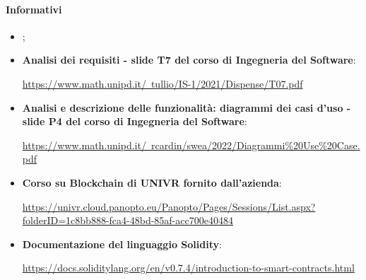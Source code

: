 \paragraph{Informativi}
\begin{itemize}
    \item \textbf{\docNameVersionPdP{}};
    \item \textbf{Analisi dei requisiti - slide T7 del corso di Ingegneria del Software}:
          \begin{center}
              \href{https://www.math.unipd.it/~tullio/IS-1/2021/Dispense/T07.pdf}{https://www.math.unipd.it/~tullio/IS-1/2021/Dispense/T07.pdf}
          \end{center}
    \item \textbf{Analisi e descrizione delle funzionalità: diagrammi dei casi d'uso - slide P4 del corso di Ingegneria del Software}:
          \begin{center}
              \href{https://www.math.unipd.it/~rcardin/swea/2022/Diagrammi%20Use%20Case.pdf}{https://www.math.unipd.it/~rcardin/swea/2022/Diagrammi\%20Use\%20Case.pdf}
          \end{center}
    \item \textbf{Corso su Blockchain di UNIVR fornito dall'azienda}:
          \begin{center}
              \href{https://univr.cloud.panopto.eu/Panopto/Pages/Sessions/List.aspx?folderID=1c8bb888-fca4-48bd-85af-acc700e40484}{https://univr.cloud.panopto.eu/Panopto/Pages/Sessions/List.aspx?folderID=1c8bb888-fca4-48bd-85af-acc700e40484}
          \end{center}
    \item \textbf{Documentazione del linguaggio Solidity\glo{}}:
          \begin{center}
              \href{https://docs.soliditylang.org/en/v0.7.4/introduction-to-smart-contracts.html}{https://docs.soliditylang.org/en/v0.7.4/introduction-to-smart-contracts.html}
          \end{center}
\end{itemize}

\clearpage


